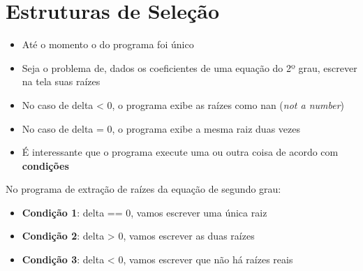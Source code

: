 \documentclass[portuguese,10pt,xcolor=table]{bredelebeamer}
\begin{document}
\section{Estruturas de Seleção}

	\def\GN[#1]{\colorbox{gray!40}{#1}}
	\def\RN[#1]{\colorbox{red!40}{#1}}
	\def\BN[#1]{\colorbox{blue!40}{#1}}
	\def\ON[#1]{\colorbox{orange!40}{#1}}
	\def\WN[#1]{\colorbox{white!40}{#1}}

	\begin{frame}[c]
		\begin{center}
		\end{center}
	\end{frame} 

	\begin{frame}
		\begin{itemize}
			\item Até o momento o  do programa foi único
			\item Seja o problema de, dados os coeficientes de uma equação do 2º grau, escrever na tela suas raízes
		\item No caso de delta < 0, o programa exibe as raízes como nan (\textit{not a number})
		\item No caso de delta = 0, o programa exibe a mesma raiz duas vezes
		\item É interessante que o programa execute uma ou outra coisa de acordo com \textbf{condições}
		\end{itemize}
	\end{frame}

	\begin{frame}
		No programa de extração de raízes da equação de segundo grau:
		\begin{itemize}
		\item \textbf{Condição 1}: delta == 0, vamos escrever uma única raiz
		\item \textbf{Condição 2}: delta > 0, vamos escrever as duas raízes
		\item \textbf{Condição 3}: delta < 0, vamos escrever que não há raízes reais
		\end{itemize}
	\end{frame}


\end{document}
